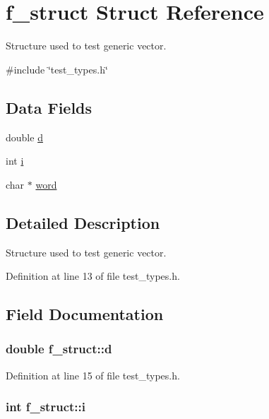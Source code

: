 \hypertarget{structf__struct}{\section{f\-\_\-struct Struct Reference}
\label{structf__struct}
}


Structure used to test generic vector.  




{\ttfamily \#include \char`\"{}test\-\_\-types.\-h\char`\"{}}

\subsection*{Data Fields}
\begin{DoxyCompactItemize}
\item 
double \hyperlink{structf__struct_aabfd173ef817f4c258a9e55aaa2ec9cf}{d}
\item 
int \hyperlink{structf__struct_a87df300d9aa87b7df7cba13e548c948f}{i}
\item 
char $\ast$ \hyperlink{structf__struct_aa8f65f08c5e6180da916f9001438eab5}{word}
\end{DoxyCompactItemize}


\subsection{Detailed Description}
Structure used to test generic vector. 



Definition at line 13 of file test\-\_\-types.\-h.



\subsection{Field Documentation}
\hypertarget{structf__struct_aabfd173ef817f4c258a9e55aaa2ec9cf}{
\subsubsection[{d}]{\setlength{\rightskip}{0pt plus 5cm}double f\-\_\-struct\-::d}}\label{structf__struct_aabfd173ef817f4c258a9e55aaa2ec9cf}


Definition at line 15 of file test\-\_\-types.\-h.

\hypertarget{structf__struct_a87df300d9aa87b7df7cba13e548c948f}{
\subsubsection[{i}]{\setlength{\rightskip}{0pt plus 5cm}int f\-\_\-struct\-::i}}\label{structf__struct_a87df300d9aa87b7df7cba13e548c948f}


